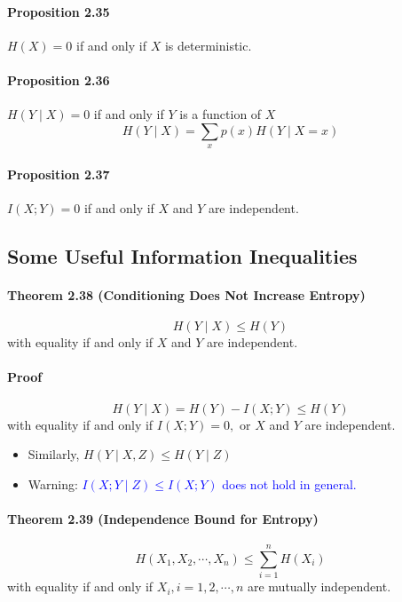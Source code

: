 \documentclass[8pt]{article}
\begin{document}
\begin{tcolorbox}
\paragraph{Proposition 2.35} $ H(X)=0$ if and only if $X$ is deterministic.\\
\paragraph{Proposition 2.36} $H(Y \mid X)=0$ if and only if $Y$ is a function of $X$
$$
H(Y \mid X)=\sum_{x} p(x) H(Y \mid X=x)
$$

\paragraph{Proposition 2.37} $I(X ; Y)=0$ if and only if $X$ and $Y$ are independent.\\
\end{tcolorbox}

\newpage
\subsection{Some Useful Information Inequalities}
\begin{tcolorbox}
\paragraph{Theorem 2.38 (Conditioning Does Not Increase Entropy)}
$$
H(Y \mid X) \leq H(Y)
$$
with equality if and only if $X$ and $Y$ are independent.
\\
\paragraph{Proof}
$$
H(Y \mid X)=H(Y)-I(X ; Y) \leq H(Y)
$$
with equality if and only if $I(X ; Y)=0,$ or $X$ and $Y$ are independent.
\\

\begin{itemize}
    \item Similarly, $H(Y \mid X, Z) \leq H(Y \mid Z)$
    \item Warning: \textcolor{blue}{$I(X ; Y \mid Z) \leq I(X ; Y)$ does not hold in general.}
\end{itemize}
\end{tcolorbox}

\begin{tcolorbox}
\paragraph{Theorem 2.39 (Independence Bound for Entropy)}
$$
H\left(X_{1}, X_{2}, \cdots, X_{n}\right) \leq \sum_{i=1}^{n} H\left(X_{i}\right)
$$
with equality if and only if $X_{i}, i=1,2, \cdots, n$ are mutually independent.
\end{tcolorbox}
\end{document}
